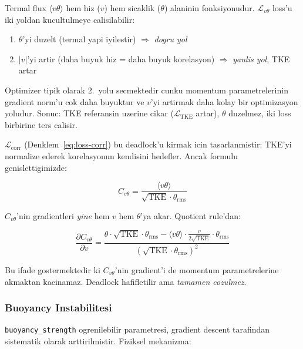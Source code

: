 Termal flux $\langle v\theta \rangle$ hem hiz ($v$) hem sicaklik ($\theta$)
alaninin fonksiyonudur. $\mathcal{L}_{v\theta}$ loss'u iki yoldan
kucultulmeye calisilabilir:

\begin{enumerate}
  \item $\theta$'yi duzelt (termal yapi iyilestir) $\Rightarrow$
        \emph{dogru yol}
  \item $|v|$'yi artir (daha buyuk hiz = daha buyuk korelasyon) $\Rightarrow$
        \emph{yanlis yol}, TKE artar
\end{enumerate}

Optimizer tipik olarak 2.~yolu secmektedir cunku momentum parametrelerinin
gradient norm'u cok daha buyuktur ve $v$'yi artirmak daha kolay bir
optimizasyon yoludur. Sonuc: TKE referansin uzerine cikar
($\mathcal{L}_\text{TKE}$ artar), $\theta$ duzelmez, iki loss birbirine ters
calisir.

$\mathcal{L}_\text{corr}$ (Denklem~\ref{eq:loss-corr}) bu deadlock'u kirmak
icin tasarlanmistir: TKE'yi normalize ederek korelasyonun kendisini
hedefler. Ancak formulu genislettigimizde:

\begin{equation}
  C_{v\theta} = \frac{\langle v\theta \rangle}{\sqrt{\text{TKE}} \cdot \theta_\text{rms}}
  \label{eq:correlation-coefficient}
\end{equation}

\noindent $C_{v\theta}$'nin gradientleri \emph{yine} hem $v$ hem $\theta$'ya
akar. Quotient rule'dan:

\begin{equation}
  \frac{\partial C_{v\theta}}{\partial v}
  = \frac{\theta \cdot \sqrt{\text{TKE}} \cdot \theta_\text{rms}
          - \langle v\theta \rangle \cdot \frac{v}{2\sqrt{\text{TKE}}} \cdot \theta_\text{rms}}
         {(\sqrt{\text{TKE}} \cdot \theta_\text{rms})^2}
  \label{eq:corr-gradient}
\end{equation}

Bu ifade gostermektedir ki $C_{v\theta}$'nin gradient'i de momentum
parametrelerine akmaktan kacinamaz. Deadlock hafifletilir ama \emph{tamamen
cozulmez}.

\subsubsection{Buoyancy Instabilitesi}

\texttt{buoyancy\_strength} ogrenilebilir parametresi, gradient descent
tarafindan sistematik olarak arttirilmistir. Fiziksel mekanizma:

